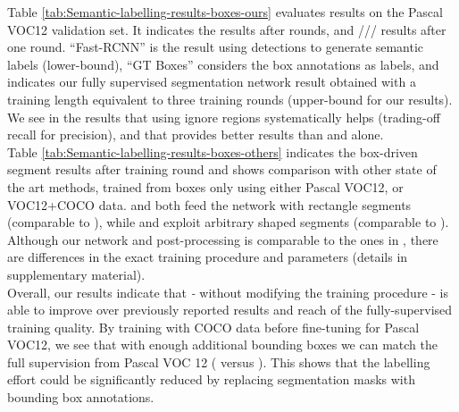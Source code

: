 \documentclass[10pt,english,british,twocolumn]{article}
\begin{document}
Table \ref{tab:Semantic-labelling-results-boxes-ours} evaluates results
on the Pascal VOC12 validation set. It indicates the 
results after  rounds, and \texttt{}///
results after one round. ``Fast-RCNN'' is the result using detections
\cite{Girshick2015IccvFastRCNN} to generate semantic labels (lower-bound),
``GT Boxes'' considers the box annotations as labels, and 
indicates our fully supervised segmentation network result obtained
with a training length equivalent to three training rounds (upper-bound
for our results). We see in the results that using ignore regions
systematically helps (trading-off recall for precision), and that
 provides better results than \texttt{}
and  alone.\\
Table \ref{tab:Semantic-labelling-results-boxes-others} indicates
the box-driven segment results after  training round and shows
comparison with other state of the art methods, trained from boxes
only using either Pascal VOC12, or VOC12+COCO data. 
and  both feed the network with rectangle segments
(comparable to ), while  and
 exploit arbitrary shaped segments (comparable
to ). Although our network and post-processing
is comparable to the ones in \cite{Dai2015Iccv,Papandreou2015Iccv},
there are differences in the exact training procedure and parameters
(details in supplementary material).\\
Overall, our results indicate that \emph{- }without modifying the
training procedure -  is able to improve
over previously reported results and reach  of the fully-supervised
training quality. By training with COCO data \cite{Lin2014EccvCoco}
before fine-tuning for Pascal VOC12, we see that with enough additional
bounding boxes we can match the full supervision from Pascal VOC 12
( versus ). This shows that the labelling effort could
be significantly reduced by replacing segmentation masks with bounding
box annotations.
\end{document}
